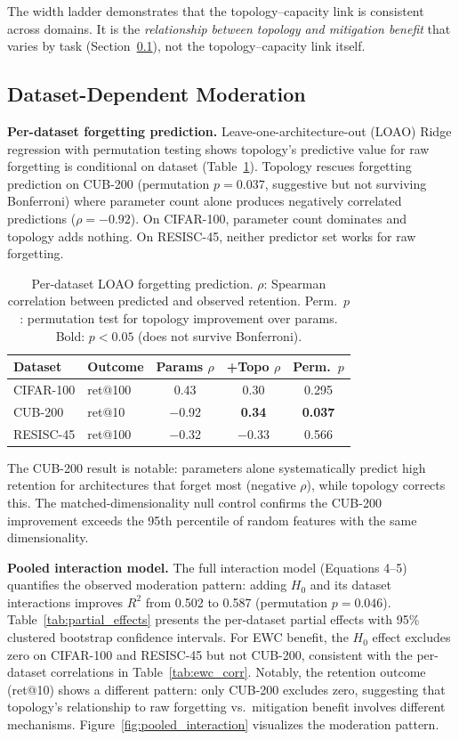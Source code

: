 \documentclass{article}
\begin{document}
The width ladder demonstrates that the topology--capacity link is consistent across domains. It is the \emph{relationship between topology and mitigation benefit} that varies by task (Section~\ref{sec:dataset_variation}), not the topology--capacity link itself.

\subsection{Dataset-Dependent Moderation}
\label{sec:dataset_variation}

\textbf{Per-dataset forgetting prediction.} Leave-one-architecture-out (LOAO) Ridge regression with permutation testing shows topology's predictive value for raw forgetting is conditional on dataset (Table~\ref{tab:loao}). Topology rescues forgetting prediction on CUB-200 (permutation $p = 0.037$, suggestive but not surviving Bonferroni) where parameter count alone produces negatively correlated predictions ($\rho = -0.92$). On CIFAR-100, parameter count dominates and topology adds nothing. On RESISC-45, neither predictor set works for raw forgetting.

\begin{table}[t]
\centering
\caption{Per-dataset LOAO forgetting prediction. $\rho$: Spearman correlation between predicted and observed retention. Perm.\ $p$: permutation test for topology improvement over params. Bold: $p < 0.05$ (does not survive Bonferroni).}
\label{tab:loao}
\small
\begin{tabular}{@{}llccc@{}}
\toprule
Dataset & Outcome & Params $\rho$ & +Topo $\rho$ & Perm.\ $p$ \\
\midrule
CIFAR-100  & ret@100 & 0.43  & 0.30  & 0.295 \\
CUB-200    & ret@10  & $-$0.92 & \textbf{0.34} & \textbf{0.037} \\
RESISC-45  & ret@100 & $-$0.32 & $-$0.33 & 0.566 \\
\bottomrule
\end{tabular}
\end{table}

The CUB-200 result is notable: parameters alone systematically predict high retention for architectures that forget most (negative $\rho$), while topology corrects this. The matched-dimensionality null control confirms the CUB-200 improvement exceeds the 95th percentile of random features with the same dimensionality.

\textbf{Pooled interaction model.} The full interaction model (Equations 4--5) quantifies the observed moderation pattern: adding $H_0$ and its dataset interactions improves $R^2$ from 0.502 to 0.587 (permutation $p = 0.046$). Table~\ref{tab:partial_effects} presents the per-dataset partial effects with 95\% clustered bootstrap confidence intervals. For EWC benefit, the $H_0$ effect excludes zero on CIFAR-100 and RESISC-45 but not CUB-200, consistent with the per-dataset correlations in Table~\ref{tab:ewc_corr}. Notably, the retention outcome (ret@10) shows a different pattern: only CUB-200 excludes zero, suggesting that topology's relationship to raw forgetting vs.\ mitigation benefit involves different mechanisms. Figure~\ref{fig:pooled_interaction} visualizes the moderation pattern.
\end{document}
